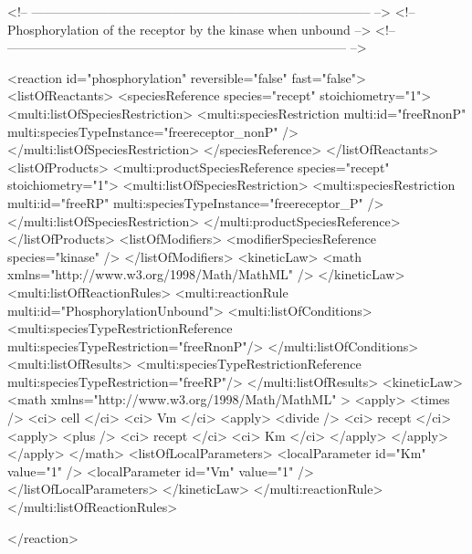 \begin{example}
<!-- -------------------------------------------------------------------------------- -->
<!-- Phosphorylation of the receptor by the kinase when unbound                        -->
<!-- -------------------------------------------------------------------------------- -->      
     
      <reaction id="phosphorylation" reversible="false" fast="false">
        <listOfReactants>
          <speciesReference species="recept" stoichiometry="1">
            <multi:listOfSpeciesRestriction>
              <multi:speciesRestriction multi:id="freeRnonP" 
                                        multi:speciesTypeInstance="freereceptor_nonP" />
            </multi:listOfSpeciesRestriction>
          </speciesReference>
        </listOfReactants>
        <listOfProducts>
          <multi:productSpeciesReference species="recept" stoichiometry="1">
            <multi:listOfSpeciesRestriction>
              <multi:speciesRestriction multi:id="freeRP" 
                                        multi:speciesTypeInstance="freereceptor_P" />
            </multi:listOfSpeciesRestriction>
          </multi:productSpeciesReference>
        </listOfProducts>
        <listOfModifiers>
          <modifierSpeciesReference species="kinase" />
        </listOfModifiers>
        <kineticLaw>
          <math xmlns="http://www.w3.org/1998/Math/MathML" />
        </kineticLaw>
        <multi:listOfReactionRules>
          <multi:reactionRule multi:id="PhosphorylationUnbound">
            <multi:listOfConditions>
              <multi:speciesTypeRestrictionReference multi:speciesTypeRestriction="freeRnonP"/>
            </multi:listOfConditions>
            <multi:listOfResults>
              <multi:speciesTypeRestrictionReference multi:speciesTypeRestriction="freeRP"/>
            </multi:listOfResults>
            <kineticLaw>
              <math xmlns="http://www.w3.org/1998/Math/MathML" >
                <apply>
                  <times />
                  <ci> cell </ci>
                  <ci> Vm </ci>
                  <apply>
                    <divide />
                    <ci> recept </ci>
                    <apply>
                      <plus />
                      <ci> recept </ci>
                      <ci> Km </ci>
                    </apply>
                  </apply>
                </apply>
              </math>
              <listOfLocalParameters>
                <localParameter id="Km" value="1" />
                <localParameter id="Vm" value="1" />
              </listOfLocalParameters>
             </kineticLaw>
          </multi:reactionRule>
        </multi:listOfReactionRules>

      </reaction>
\end{example}

